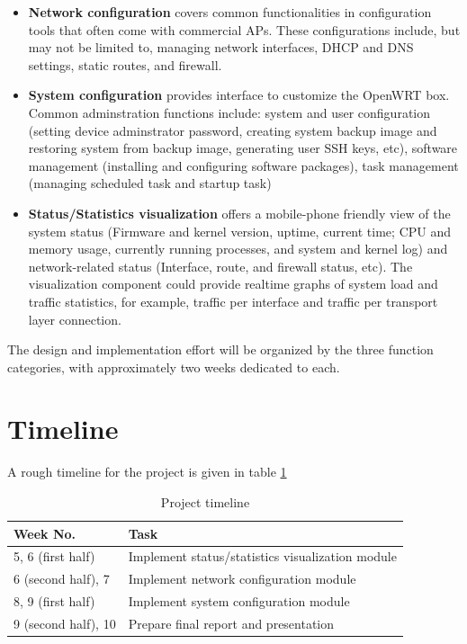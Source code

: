 \documentclass{sig-alternate-05-2015}
\begin{document}
\begin{itemize}

\item
\textbf{Network configuration} covers common functionalities in configuration tools that often come with commercial APs. These configurations include, but may not be limited to, managing network interfaces, DHCP and DNS settings, static routes, and firewall.

\item
\textbf{System configuration} provides interface to customize the OpenWRT box. Common adminstration functions include: system and user configuration (setting device adminstrator password, creating system backup image and restoring system from backup image, generating user SSH keys, etc), software management (installing and configuring software packages), task management (managing scheduled task and startup task)

\item
\textbf{Status/Statistics visualization} offers a mobile-phone friendly view of the system status (Firmware and kernel version, uptime, current time; CPU and memory usage, currently running processes, and system and kernel log) and network-related status (Interface, route, and firewall status, etc). The visualization component could provide realtime graphs of system load and traffic statistics, for example, traffic per interface and traffic per transport layer connection.

\end{itemize}

The design and implementation effort will be organized by the three function categories, with approximately two weeks dedicated to each.

\section{Timeline}

A rough timeline for the project is given in table \ref{table:timeline}

\begin{table}[h]
\centering
\caption{Project timeline}
\label{table:timeline}
\begin{tabular}{p{3cm}|p{5cm}} \hline
Week No. & Task \\ \hline
5, 6 (first half) & Implement status/statistics visualization module \\ \hline
6 (second half), 7 & Implement network configuration module \\ \hline
8, 9 (first half) & Implement system configuration module \\ \hline
9 (second half), 10 & Prepare final report and presentation \\
\hline\end{tabular}
\end{table}
\end{document}
